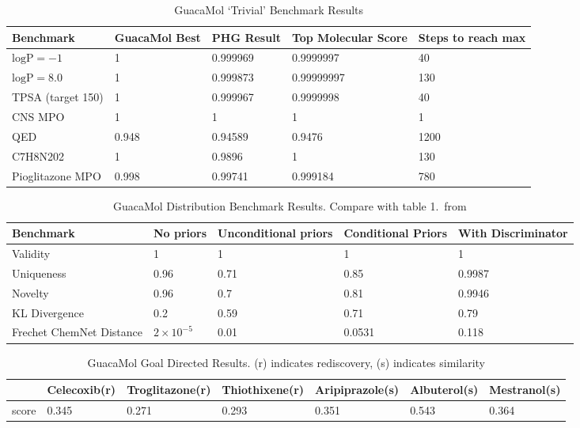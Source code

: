 \documentclass{article}
\begin{document}
\begin{table}
    \caption{GuacaMol `Trivial' Benchmark Results}
    \label{tab:guac-trivial}
    \centering
    \begin{tabular}{lllll}
        \toprule
        Benchmark & GuacaMol Best & PHG Result & Top Molecular Score & Steps to reach max \\
        \midrule
        $\text{logP} = -1$ & 1 & 0.999969 & 0.9999997 & 40 \\
        $\text{logP} = 8.0$ & 1 & 0.999873 & 0.99999997 & 130 \\
        TPSA (target 150) & 1 & 0.999967 & 0.9999998 & 40 \\
        CNS MPO & 1 & 1 & 1 & 1 \\
        QED & 0.948 & 0.94589 & 0.9476 & 1200 \\
        C7H8N202 & 1 & 0.9896 & 1 & 130 \\
        Pioglitazone MPO & 0.998 & 0.99741 & 0.999184 & 780 \\
        \bottomrule
    \end{tabular}
\end{table}

\begin{table}
    \caption{GuacaMol Distribution Benchmark Results. Compare with table 1.~from \cite{brown2019}}
    \label{tab:distr}
    \centering
    \begin{tabular}{lllll}
        \toprule
        Benchmark & No priors & Unconditional priors & Conditional Priors & With Discriminator \\
        \midrule
        Validity & 1 & 1 & 1 & 1 \\
        Uniqueness & 0.96 & 0.71 & 0.85 & 0.9987 \\
        Novelty & 0.96 & 0.7 & 0.81 & 0.9946 \\
        KL Divergence & 0.2 & 0.59 & 0.71 & 0.79 \\
        Frechet ChemNet Distance & $2 \times 10^{-5}$ & 0.01 & 0.0531 & 0.118 \\
        \bottomrule
    \end{tabular}
\end{table}

\begin{table}
    \caption{GuacaMol Goal Directed Results. (r) indicates rediscovery, (s) indicates similarity}
    \label{tab:gdb1}
    \centering
    \begin{tabular}{lllllll}
        \toprule
        & Celecoxib(r) & Troglitazone(r) & Thiothixene(r)  & Aripiprazole(s)  & Albuterol(s) & Mestranol(s) \\
        \midrule
        score & 0.345 & 0.271 & 0.293 & 0.351 & 0.543 & 0.364 \\
        \bottomrule
    \end{tabular}
\end{table}
\end{document}

